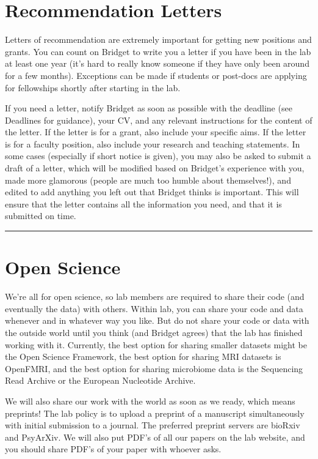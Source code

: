 \documentclass[]{book}
\begin{document}
\hypertarget{recommendation-letters}{%
\section{Recommendation Letters}\label{recommendation-letters}}

Letters of recommendation are extremely important for getting new positions and grants. You can count on Bridget to write you a letter if you have been in the lab at least one year (it's hard to really know someone if they have only been around for a few months). Exceptions can be made if students or post-docs are applying for fellowships shortly after starting in the lab.

If you need a letter, notify Bridget as soon as possible with the deadline (see Deadlines for guidance), your CV, and any relevant instructions for the content of the letter. If the letter is for a grant, also include your specific aims. If the letter is for a faculty position, also include your research and teaching statements. In some cases (especially if short notice is given), you may also be asked to submit a draft of a letter, which will be modified based on Bridget's experience with you, made more glamorous (people are much too humble about themselves!), and edited to add anything you left out that Bridget thinks is important. This will ensure that the letter contains all the information you need, and that it is submitted on time.

\begin{center}\rule{0.5\linewidth}{0.5pt}\end{center}

\hypertarget{open-science}{%
\section{Open Science}\label{open-science}}

We're all for open science, so lab members are required to share their code (and eventually the data) with others. Within lab, you can share your code and data whenever and in whatever way you like. But do not share your code or data with the outside world until you think (and Bridget agrees) that the lab has finished working with it. Currently, the best option for sharing smaller datasets might be the Open Science Framework, the best option for sharing MRI datasets is OpenFMRI, and the best option for sharing microbiome data is the Sequencing Read Archive or the European Nucleotide Archive.

We will also share our work with the world as soon as we ready, which means preprints! The lab policy is to upload a preprint of a manuscript simultaneously with initial submission to a journal. The preferred preprint servers are bioRxiv and PsyArXiv. We will also put PDF's of all our papers on the lab website, and you should share PDF's of your paper with whoever asks.
\end{document}
